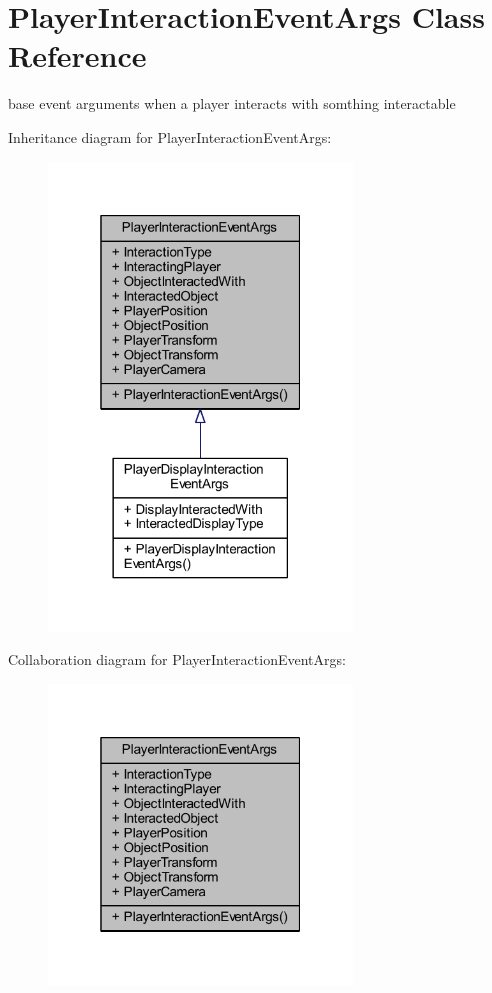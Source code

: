 \hypertarget{class_player_interaction_event_args}{}\section{Player\+Interaction\+Event\+Args Class Reference}
\label{class_player_interaction_event_args}


base event arguments when a player interacts with somthing interactable  




Inheritance diagram for Player\+Interaction\+Event\+Args\+:
\nopagebreak
\begin{figure}[H]
\begin{center}
\leavevmode
\includegraphics[width=229pt]{class_player_interaction_event_args__inherit__graph}
\end{center}
\end{figure}


Collaboration diagram for Player\+Interaction\+Event\+Args\+:
\nopagebreak
\begin{figure}[H]
\begin{center}
\leavevmode
\includegraphics[width=229pt]{class_player_interaction_event_args__coll__graph}
\end{center}
\end{figure}

